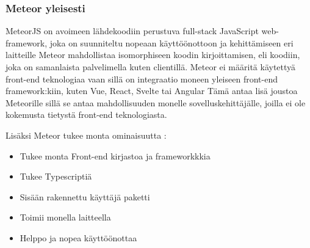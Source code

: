 



\subsubsection{Meteor yleisesti}








MeteorJS on avoimeen lähdekoodiin perustuva full-stack JavaScript web-framework, joka on 
suunniteltu nopeaan käyttöönottoon ja kehittämiseen eri laitteille 
Meteor mahdollistaa isomorphiseen koodin kirjoittamisen, eli koodiin, joka on samanlaista palvelimella kuten clientillä. %
Meteor ei määritä käytettyä front-end teknologiaa vaan sillä on integraatio moneen yleiseen front-end framework:kiin, kuten Vue, React, Svelte tai Angular 
Tämä antaa lisä joustoa Meteorille sillä se antaa mahdollisuuden monelle sovelluskehittäjälle, joilla ei ole kokemusta tietystä front-end teknologiasta.\\
\medskip



    

Lisäksi Meteor tukee monta ominaisuutta :
\begin{itemize}
    \item Tukee monta Front-end kirjastoa ja frameworkkkia
    \item Tukee Typescriptiä
    \item Sisään rakennettu käyttäjä paketti
    \item Toimii monella laitteella
    \item Helppo ja nopea käyttöönottaa 
\end{itemize}
\medskip



